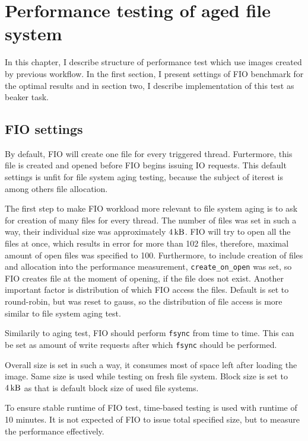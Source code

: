 \documentclass[
  color, %
  table, %
  lof,   %
  lot,   %
]{fithesis3}
\begin{document}
\chapter{Performance testing of aged file system}
\label{fio}
In this chapter, I describe structure of performance test which use images created by previous workflow. In the first section, I present settings of FIO benchmark for the optimal results and in section two, I describe implementation of this test as beaker task.

\section{FIO settings} 


By default, FIO will create one file for every triggered thread. Furtermore, this file is created and opened before FIO begins issuing IO requests. This default settings is unfit for file system aging testing, because the subject of iterest is among others file allocation.

The first step to make FIO workload more relevant to file system aging is to ask for creation of many files for every thread. The number of files was set in such a way, their individual size was approximately $\SI{4}{\kilo\byte}$. FIO will try to open all the files at once, which results in error for more than 102 files, therefore, maximal amount of open files was specified to 100. Furthermore, to include creation of files and allocation into the performance measurement, \texttt{create\_on\_open} was set, so FIO creates file at the moment of opening, if the file does not exist. Another important factor is distribution of which FIO access the files. Default is set to round-robin, but was reset to gauss, so the distribution of file access is more similar to file system aging test.

Similarily to aging test, FIO should perform \texttt{fsync} from time to time. This can be set as amount of write requests after which \texttt{fsync} should be performed.

Overall size is set in such a way, it consumes most of space left after loading the image. Same size is used while testing on fresh file system. Block size is set to $\SI{4}{\kilo\byte}$ as that is default block size of used file systems.

To ensure stable runtime of FIO test, time-based testing is used with runtime of 10 minutes. It is not expected of FIO to issue total specified size, but to measure the performance effectively.
\end{document}
